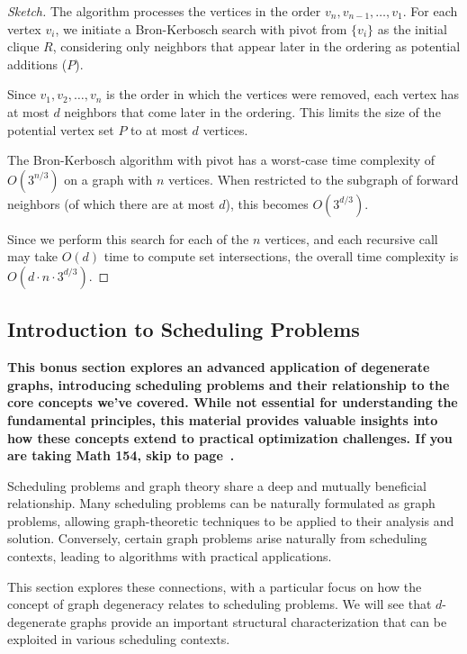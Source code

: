 \documentclass{article}
\theoremstyle{definition}
\begin{document}
\begin{proof}[Sketch]
The algorithm processes the vertices in the order $v_n, v_{n-1}, \ldots, v_1$. For each vertex $v_i$, we initiate a Bron-Kerbosch search with pivot from $\{v_i\}$ as the initial clique $R$, considering only neighbors that appear later in the ordering as potential additions ($P$).

Since $v_1, v_2, \ldots, v_n$ is the order in which the vertices were removed, each vertex has at most $d$ neighbors that come later in the ordering. This limits the size of the potential vertex set $P$ to at most $d$ vertices.

The Bron-Kerbosch algorithm with pivot has a worst-case time complexity of $O(3^{n/3})$ on a graph with $n$ vertices. When restricted to the subgraph of forward neighbors (of which there are at most $d$), this becomes $O(3^{d/3})$.

Since we perform this search for each of the $n$ vertices, and each recursive call may take $O(d)$ time to compute set intersections, the overall time complexity is $O(d \cdot n \cdot 3^{d/3})$.
\end{proof}

\subsection{Introduction to Scheduling Problems}
\textbf{This bonus section explores an advanced application of degenerate graphs, introducing scheduling problems and their relationship to the core concepts we've covered. While not essential for understanding the fundamental principles, this material provides valuable insights into how these concepts extend to practical optimization challenges. If you are taking Math 154, skip to page~\pageref{subsec:scheduling-problem}.}


Scheduling problems and graph theory share a deep and mutually beneficial relationship. Many scheduling problems can be naturally formulated as graph problems, allowing graph-theoretic techniques to be applied to their analysis and solution. Conversely, certain graph problems arise naturally from scheduling contexts, leading to algorithms with practical applications.

This section explores these connections, with a particular focus on how the concept of graph degeneracy relates to scheduling problems. We will see that $d$-degenerate graphs provide an important structural characterization that can be exploited in various scheduling contexts.
\end{document}
